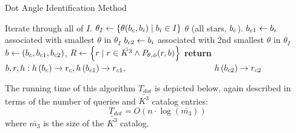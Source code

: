 %

\begin{algorithm}
    \caption{Dot Angle Identification Method} \label{algorithm:dotAngleIdentification}
    \begin{algorithmic}[1]
          \Comment Iterate through all of $I$.
        \State $\theta_I \gets \{\theta(b_c, b_i) \mid b_i \in I\}$ \Comment $\theta$ 
        (all stars, $b_c$).
        \State $b_{c1} \gets b_i$ associated with smallest $\theta$ in $\theta_I$
        \State $b_{c2} \gets b_i$ associated with 2nd smallest $\theta$ in $\theta_I$
        \State $b \gets \left(b_c, b_{c1}, b_{c2}\right)$, $R \gets \left\{  r \mid r \in \bar{K^3} \land
        P_{\theta, \phi}(r, b)  \right\}$
        \State \textbf{return} $b, r, h: h\left(b_c\right) \rightarrow r_c, h\left(b_{c1}\right)
        \rightarrow r_{c1},$
        \State \ \ \ \ \ \ \ \ \ \ \ \ \ \  \ \ \ \ \ \ $h\left(b_{c2}\right) \rightarrow r_{c2}$
        \EndIf
        \EndFor
        \EndFunction
    \end{algorithmic}
\end{algorithm}

The running time of this algorithm $T_{dot}$ is depicted below, again described in terms of the number of queries
and $\bar{K^3}$ catalog entries:
\begin{equation}\label{eq:dotComplexity}
    T_{dot} = O\left( n \cdot \log(\bar{m_3}) \right)
\end{equation}
where $\bar{m_3}$ is the size of the $\bar{K^3}$ catalog.

